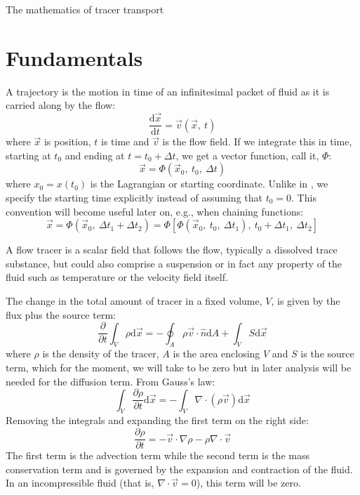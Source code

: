 \documentclass[12pt]{article}
\begin{document}
{\Large The mathematics of tracer transport}

\section{Fundamentals}

A trajectory is the motion in time of an infinitesimal packet of fluid
as it is carried along by the flow:
\begin{equation}
\frac{\mathrm d \vec x}{\mathrm d t}=\vec v(\vec x,~t)
\end{equation}
where $\vec x$ is position, $t$ is time and $\vec v$ is the flow field.
If we integrate this in time, starting at $t_0$ and ending at $t=t_0+\Delta t$, we get a
vector function, call it, $\Phi$:
\begin{equation}
\vec x=\Phi(\vec x_0,~t_0,~\Delta t)
\label{traj_def}
\end{equation}
where $x_0=x(t_0)$ is the Lagrangian or starting coordinate.
Unlike in \citet{Ottino1989}, we specify the starting time explicitly instead 
of assuming that $t_0=0$.  This convention will become useful later on, e.g., 
when chaining functions:
\begin{equation}
\vec x=\Phi(\vec x_0,~\Delta t_1+\Delta t_2)=\Phi[\Phi(\vec x_0,~t_0,~\Delta t_1),~t_0 + \Delta t_1,~\Delta t_2]
\end{equation}

A flow tracer is a scalar field that follows the flow, typically a dissolved
trace substance, but could also comprise a suspension or in fact any property
of the fluid such as temperature or the velocity field itself.

The change in the total amount of tracer in a fixed volume, $V$, is given
by the flux plus the source term:
\begin{equation}
\frac{\partial}{\partial t}\int_V \rho \mathrm d \vec x=-\oint_A \rho \vec v \cdot \hat n \mathrm d A
	+ \int_V S \mathrm d \vec x
\end{equation}
where $\rho$ is the density of the tracer,
$A$ is the area enclosing $V$ and $S$ is the source term, which for the moment,
we will take to be zero but in later analysis will 
be needed for the diffusion term.
From Gauss's law:
\begin{equation}
\int_V \frac{\partial \rho}{\partial t} \mathrm d \vec x=-\int_V \nabla \cdot (\rho \vec v)\mathrm d \vec x 
\end{equation}
Removing the integrals and expanding the first term on the right side:
\begin{equation}
\frac{\partial \rho}{\partial t} =-\vec v \cdot \nabla \rho - \rho \nabla \cdot \vec v 
\label{mass_conservation_Eulerian}
\end{equation}
The first term is the advection term while the second term is the mass
conservation term and is governed by the 
expansion and contraction of the fluid.  In an incompressible fluid (that is,
$\nabla \cdot \vec v = 0$), this term will be zero.
\end{document}
